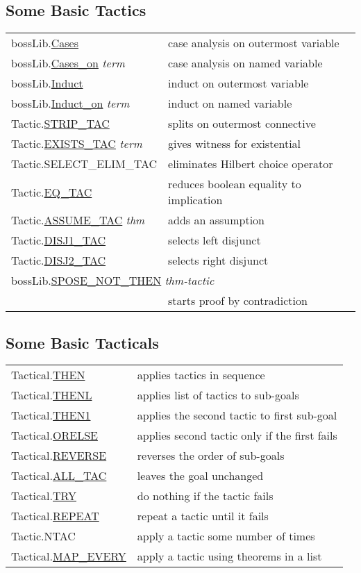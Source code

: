 \documentclass[landscape,10pt]{article}
\newcommand{\hol}[2]{{\sffamily #1.\href{#1.#2.html}{#2}}}
\newcommand{\holnoref}[2]{{\sffamily #1.#2}}
\newcommand{\var}[1]{{\emph{#1}}}
\begin{document}
\begin{multicols}{3}
\subsection*{Some Basic Tactics}
\begin{tabular}{ll}
\hol{bossLib}{Cases} & case analysis on outermost variable \\
\hol{bossLib}{Cases_on} \var{term} & case analysis on named variable \\
\hol{bossLib}{Induct} & induct on outermost variable \\
\hol{bossLib}{Induct_on} \var{term} & induct on named variable \\
\hol{Tactic}{STRIP_TAC} & splits on outermost connective \\
\hol{Tactic}{EXISTS_TAC} \var{term} & gives witness for existential \\
\holnoref{Tactic}{SELECT_ELIM_TAC} & eliminates Hilbert choice operator \\
\hol{Tactic}{EQ_TAC} & reduces boolean equality to implication \\
\hol{Tactic}{ASSUME_TAC} \var{thm} & adds an assumption \\
\hol{Tactic}{DISJ1_TAC} & selects left disjunct \\
\hol{Tactic}{DISJ2_TAC} & selects right disjunct \\
\multicolumn{2}{l}{\hol{bossLib}{SPOSE_NOT_THEN} \var{thm-tactic}} \\
& \quad starts proof by contradiction \\
\end{tabular}
\subsection*{Some Basic Tacticals}
\begin{tabular}{ll}
\hol{Tactical}{THEN} & applies tactics in sequence \\
\hol{Tactical}{THENL} & applies list of tactics to sub-goals \\
\hol{Tactical}{THEN1} & applies the second tactic to first sub-goal \\
\hol{Tactical}{ORELSE} & applies second tactic only if the first fails \\
\hol{Tactical}{REVERSE} & reverses the order of sub-goals \\
\hol{Tactical}{ALL_TAC} & leaves the goal unchanged \\
\hol{Tactical}{TRY} & do nothing if the tactic fails \\
\hol{Tactical}{REPEAT} & repeat a tactic until it fails \\
\holnoref{Tactic}{NTAC} & apply a tactic some number of times \\
\hol{Tactical}{MAP_EVERY} & apply a tactic using theorems in a list \\
\end{tabular}

\end{multicols}
\end{document}
